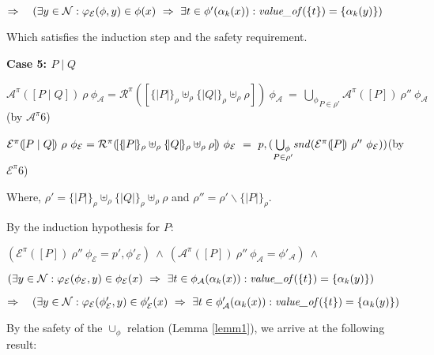 \documentclass[10pt,a4paper,final,oneside,fleqn]{book}
\begin{document}
\noindent
$\Rightarrow~~~(\exists y\in\mathcal{N}:\varphi_\mathcal{E}(\phi,y)\in\phi(x)~\Rightarrow~\exists t\in\phi'(\alpha_k(x)):\mbox{{\itshape value\_of\/}}(\{t\})=\{\alpha_k(y)\})$\vspace{5mm}

\noindent
Which satisfies the induction step and the safety requirement.\vspace{5mm}

\noindent
{\bf Case 5: $P\mid Q$}

\noindent
$\mathcal{A}^\pi(\![P\mid Q]\!)~\rho~\phi_\mathcal{A}={\mathcal R}^\pi(\![\{\!|P|\!\}_\rho\uplus_\rho\{\!|Q|\!\}_\rho\uplus_\rho\rho]\!)~\phi_\mathcal{A}~=~\underset{P\in\rho'}{\bigcup_\phi}\mathcal{A}^\pi(\![P]\!)~\rho''~\phi_\mathcal{A}$\hfill(by $\mathcal{A}^{\pi}6$)\vspace{5mm}

\noindent
$\mathcal{E}^\pi(\![P\mid Q]\!)~\rho~\phi_\mathcal{E}={\mathcal R}^\pi(\![\{\!|P|\!\}_\rho\uplus_\rho\{\!|Q|\!\}_\rho\uplus_\rho\rho]\!)~\phi_\mathcal{E}~=~p,(\underset{P\in\rho'}{\bigcup_\phi}\mbox{{\itshape snd\/}}(\mathcal{E}^\pi(\![P]\!)~\rho''~\phi_\mathcal{E}))$\hfill(by $\mathcal{E}^{\pi}6$)\vspace{5mm}

\noindent
Where, $\rho'=\{\!|P|\!\}_\rho\uplus_\rho\{\!|Q|\!\}_\rho\uplus_\rho\rho$ and $\rho''=\rho'\backslash\{\!|P|\!\}_\rho$.\vspace{5mm}

\noindent
By the induction hypothesis for $P$:

\noindent
$(\mathcal{E}^\pi(\![P]\!)~\rho''~\phi_{\mathcal{E}}=p',\phi'_\mathcal{E})~\wedge~(\mathcal{A}^\pi(\![P]\!)~\rho''~\phi_{\mathcal{A}}=\phi'_\mathcal{A})~\wedge$

\noindent
$(\exists y\in\mathcal{N}:\varphi_\mathcal{E}(\phi_\mathcal{E},y)\in\phi_\mathcal{E}(x)~\Rightarrow~\exists t\in\phi_\mathcal{A}(\alpha_k(x)):\mbox{{\itshape value\_of\/}}(\{t\})=\{\alpha_k(y)\})$\vspace{5mm}

\noindent
$\Rightarrow~~~(\exists y\in\mathcal{N}:\varphi_\mathcal{E}(\phi'_\mathcal{E},y)\in\phi'_\mathcal{E}(x)~\Rightarrow~\exists t\in\phi'_\mathcal{A}(\alpha_k(x)):\mbox{{\itshape value\_of\/}}(\{t\})=\{\alpha_k(y)\})$\vspace{5mm}

\noindent
By the safety of the $\cup_\phi$ relation (Lemma \ref{lemm1}), we arrive at the following result:\vspace{5mm}
\end{document}
